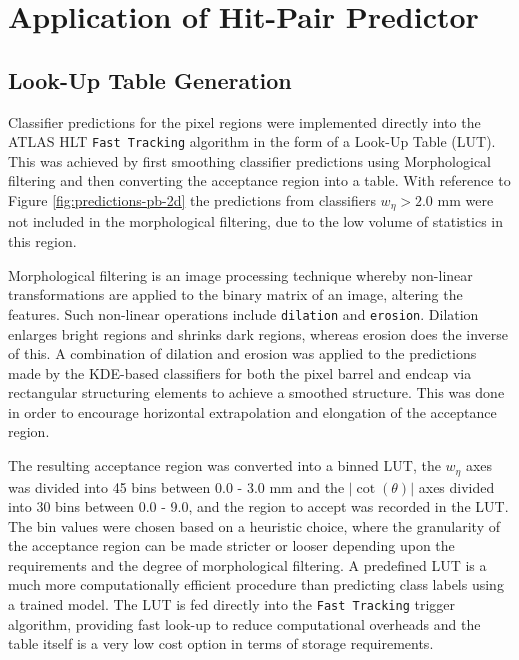 \section{Application of Hit-Pair Predictor}
\label{application-of-hit-pair-predictor}

\subsection{Look-Up Table Generation}
\label{LUT-generation}

Classifier predictions for the pixel regions were implemented directly into the ATLAS HLT \texttt{Fast Tracking} algorithm in the form of a Look-Up Table (LUT). This was achieved by first smoothing classifier predictions using Morphological filtering \cite{morphological-filtering} and then converting the acceptance region into a table. With reference to Figure \ref{fig:predictions-pb-2d} the predictions from classifiers $w_{\eta} > 2.0$ mm were not included in the morphological filtering, due to the low volume of statistics in this region. 

Morphological filtering is an image processing technique whereby non-linear transformations are applied to the binary matrix of an image, altering the features. Such non-linear operations include \texttt{dilation} and \texttt{erosion}. Dilation enlarges bright regions and shrinks dark regions, whereas erosion does the inverse of this. A combination of dilation and erosion was applied to the predictions made by the KDE-based classifiers for both the pixel barrel and endcap via rectangular structuring elements to achieve a smoothed structure. This was done in order to encourage horizontal extrapolation and elongation of the acceptance region.

The resulting acceptance region was converted into a binned LUT, the $w_{\eta}$ axes was divided into 45 bins between 0.0 - 3.0 mm and the $\lvert \cot(\theta) \rvert$ axes divided into 30 bins between 0.0 - 9.0, and the region to accept was recorded in the LUT. The bin values were chosen based on a heuristic choice, where the granularity of the acceptance region can be made stricter or looser depending upon the requirements and the degree of morphological filtering. A predefined LUT is a much more computationally efficient procedure than predicting class labels using a trained model. The LUT is fed directly into the \texttt{Fast Tracking} trigger algorithm, providing fast look-up to reduce computational overheads and the table itself is a very low cost option in terms of storage requirements. 



